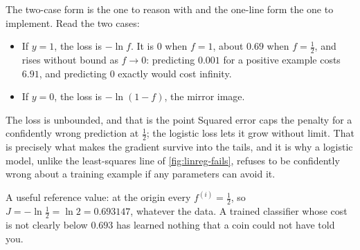 The two-case form is the one to reason with and the one-line form the one to
implement. Read the two cases:

\begin{itemize}
  \item If $y = 1$, the loss is $-\ln f$. It is $0$ when $f = 1$, about $0.69$
        when $f = \tfrac12$, and rises without bound as $f \to 0$: predicting
        $0.001$ for a positive example costs $6.91$, and predicting $0$ exactly
        would cost infinity.
  \item If $y = 0$, the loss is $-\ln(1-f)$, the mirror image.
\end{itemize}

\begin{keyinsight}{The loss is unbounded, and that is the point}
Squared error caps the penalty for a confidently wrong prediction at $\tfrac12$;
the logistic loss lets it grow without limit. That is precisely what makes the
gradient survive into the tails, and it is why a logistic model, unlike the
least-squares line of \cref{fig:linreg-fails}, refuses to be confidently wrong
about a training example if any parameters can avoid it.

A useful reference value: at the origin every $f^{(i)} = \tfrac12$, so
$J = -\ln\tfrac12 = \ln 2 = 0.693147$, whatever the data. A trained classifier
whose cost is not clearly below $0.693$ has learned nothing that a coin could
not have told you.
\end{keyinsight}

